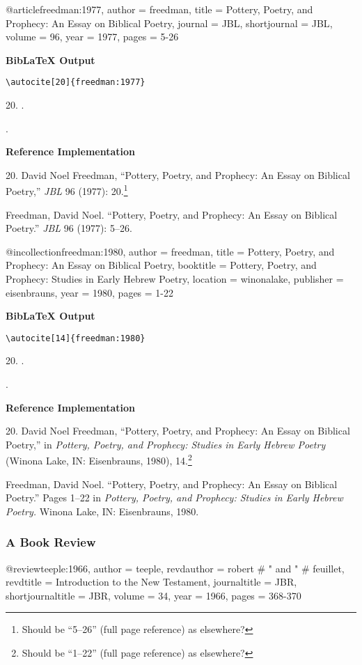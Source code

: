 \documentclass[a4paper]{article}
\newcommand\citetestns[3]{%
  {\textbf{BibLaTeX Output}\par
   \nobreak
   \texttt{\textbackslash autocite[#2]\{#3\}}\par
   \color{biblatex-colour}
   #1. \cite[#2]{#3}.\par
   \hangindent\bibindent\bibentrycite{#3}.\par}}
\newenvironment{refimp}{%
  \begin{minipage}{\linewidth}
    \setlength{\parskip}{1ex}
    \textbf{Reference Implementation}\par
    \nobreak
    \color{reference-colour}
}{\end{minipage}}
\newenvironment{vb}{%
  \setlength{\parskip}{0pt}
  \verbatim}{\endverbatim}
\begin{document}
\begin{vb}
@article{freedman:1977,
  author = freedman,
  title = {Pottery, Poetry, and Prophecy: An Essay on Biblical
           Poetry},
  journal = JBL,
  shortjournal = {JBL},
  volume = {96},
  year = {1977},
  pages = {5-26}
}
\end{vb}

\citetestns{20}{20}{freedman:1977}

\begin{refimp}
  20. David Noel Freedman, “Pottery, Poetry, and Prophecy: An Essay on
  Biblical Poetry,” \emph{JBL} 96 (1977): 20.\footnote{Should be “5–26” (full
    page reference) as elsewhere?}

  \hangindent\bibindent Freedman, David Noel. “Pottery, Poetry, and Prophecy:
  An Essay on Biblical Poetry.” \emph{JBL} 96 (1977): 5–26.
\end{refimp}

\begin{vb}
@incollection{freedman:1980,
  author = freedman,
  title = {Pottery, Poetry, and Prophecy: An Essay on Biblical
           Poetry},
  booktitle = {Pottery, Poetry, and Prophecy: Studies in Early
               Hebrew Poetry},
  location = winonalake,
  publisher = eisenbrauns,
  year = {1980},
  pages = {1-22}
}
\end{vb}

\citetestns{20}{14}{freedman:1980}

\begin{refimp}
  20. David Noel Freedman, “Pottery, Poetry, and Prophecy: An Essay on Biblical
  Poetry,” in \emph{Pottery, Poetry, and Prophecy: Studies in Early Hebrew
  Poetry} (Winona Lake, IN: Eisenbrauns, 1980), 14.\footnote{Should be “1–22”
  (full page reference) as elsewhere?}

  \hangindent\bibindent Freedman, David Noel. “Pottery, Poetry, and Prophecy:
  An Essay on Biblical Poetry.” Pages 1–22 in \emph{Pottery, Poetry, and
  Prophecy: Studies in Early Hebrew Poetry.} Winona Lake, IN: Eisenbrauns,
  1980.
\end{refimp}

\subsubsection{A Book Review}

\begin{vb}
@review{teeple:1966,
  author = teeple,
  revdauthor = robert # " and " # feuillet,
  revdtitle = {Introduction to the New Testament},
  journaltitle = JBR,
  shortjournaltitle = {JBR},
  volume = {34},
  year = {1966},
  pages = {368-370}
}
\end{vb}
\end{document}
